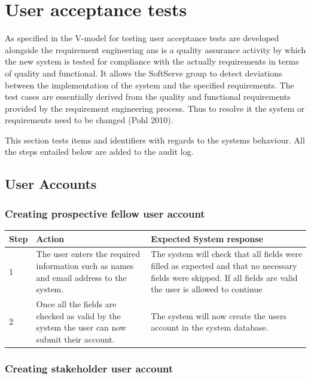 \documentclass[12pt]{article}
\begin{document}
\section{User acceptance tests}
As specified in the V-model for testing user acceptance tests are developed alongside the requirement engineering ans is a quality assurance activity by which the new system is tested for compliance with the actually requirements in terms of quality and functional. It allows the SoftServe group to detect deviations between the implementation of the system and the specified requirements. The test cases are essentially derived from the quality and functional requirements provided by the requirement engineering process. Thus to resolve it the system or requirements need to be changed (Pohl 2010).

This section tests items and identifiers with regards to the systems behaviour. All the steps entailed below are added to the audit log.

\subsection{User Accounts}

\subsubsection{Creating prospective fellow user account}

\begin{center}
\begin{tabular}{|l|p{6cm}|p{8cm}|}
\hline
Step & Action & Expected System response \\
\hline
1 & The user enters the required information such as names and email address to the system.  & The system will check that all fields were filled as expected and that no necessary fields were skipped. If all fields are valid the user is allowed to continue \\
\hline
2 & Once all the fields are checked as valid by the system the user can now submit their account. & The system will now create the users account in the system database. \\
\hline
\end{tabular}
\end{center}

\subsubsection{Creating stakeholder user account}
\end{document}
